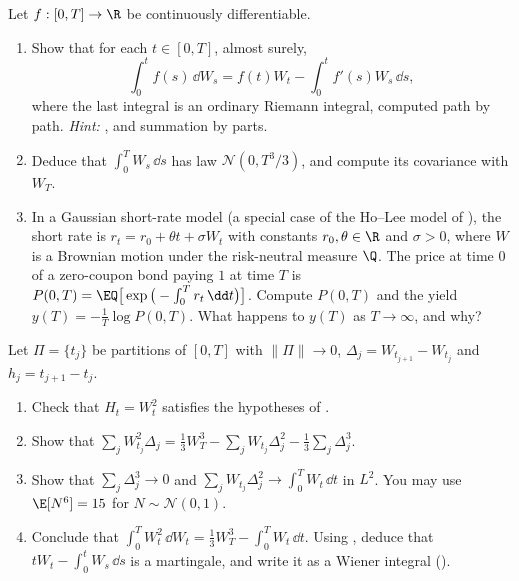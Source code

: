\begin{exercise}\label{ex:ito-parts}
\medium Let $f:[0,T]\to\R$ be continuously differentiable.
\begin{enumerate}[label=(\alph*)]
  \item Show that for each $t\in[0,T]$, almost surely,
    \[
      \int_0^tf(s)\,\dd W_s=f(t)W_t-\int_0^tf'(s)W_s\,\dd s,
    \]
    where the last integral is an ordinary Riemann integral, computed path by path.
    \emph{Hint:} , and summation by parts.
  \item Deduce that $\int_0^TW_s\,\dd s$ has law $\mathcal N(0,T^3/3)$, and compute its
    covariance with $W_T$.
  \item In a Gaussian short-rate model (a special case of the Ho--Lee model of
    ), the short rate is $r_t=r_0+\theta t+\sigma W_t$ with constants
    $r_0,\theta\in\R$ and $\sigma>0$, where $W$ is a Brownian motion under the risk-neutral
    measure $\Q$. The price at time $0$ of a zero-coupon bond paying $1$ at time $T$ is
    $P(0,T)=\EQ\big[\exp\big(-\int_0^Tr_t\,\dd t\big)\big]$. Compute $P(0,T)$ and the yield
    $y(T)=-\frac1T\log P(0,T)$. What happens to $y(T)$ as $T\to\infty$, and why?
\end{enumerate}
\end{exercise}

\begin{exercise}\label{ex:ito-w2dw}
\medium Let $\Pi=\{t_j\}$ be partitions of $[0,T]$ with $\|\Pi\|\to0$,
$\Delta_j=W_{t_{j+1}}-W_{t_j}$ and $h_j=t_{j+1}-t_j$.
\begin{enumerate}[label=(\alph*)]
  \item Check that $H_t=W_t^2$ satisfies the hypotheses of .
  \item Show that
    $\sum_jW_{t_j}^2\Delta_j=\frac13W_T^3-\sum_jW_{t_j}\Delta_j^2-\frac13\sum_j\Delta_j^3$.
  \item Show that $\sum_j\Delta_j^3\to0$ and $\sum_jW_{t_j}\Delta_j^2\to\int_0^TW_t\,\dd t$ in
    $L^2$. You may use $\E[N^6]=15$ for $N\sim\mathcal N(0,1)$.
  \item Conclude that $\int_0^TW_t^2\,\dd W_t=\frac13W_T^3-\int_0^TW_t\,\dd t$. Using
    , deduce that $tW_t-\int_0^tW_s\,\dd s$ is a martingale, and write it
    as a Wiener integral ().
\end{enumerate}
\end{exercise}

